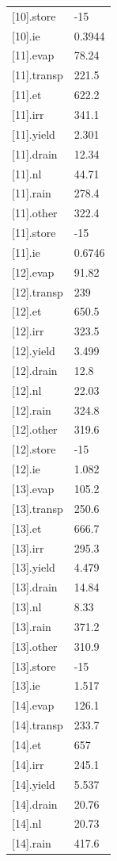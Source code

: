 {\begin{longtable}{p{}p{}}
{}[10].store & -15\\
{}[10].ie & 0.3944\\
{}[11].evap & 78.24\\
{}[11].transp & 221.5\\
{}[11].et & 622.2\\
{}[11].irr & 341.1\\
{}[11].yield & 2.301\\
{}[11].drain & 12.34\\
{}[11].nl & 44.71\\
{}[11].rain & 278.4\\
{}[11].other & 322.4\\
{}[11].store & -15\\
{}[11].ie & 0.6746\\
{}[12].evap & 91.82\\
{}[12].transp & 239\\
{}[12].et & 650.5\\
{}[12].irr & 323.5\\
{}[12].yield & 3.499\\
{}[12].drain & 12.8\\
{}[12].nl & 22.03\\
{}[12].rain & 324.8\\
{}[12].other & 319.6\\
{}[12].store & -15\\
{}[12].ie & 1.082\\
{}[13].evap & 105.2\\
{}[13].transp & 250.6\\
{}[13].et & 666.7\\
{}[13].irr & 295.3\\
{}[13].yield & 4.479\\
{}[13].drain & 14.84\\
{}[13].nl & 8.33\\
{}[13].rain & 371.2\\
{}[13].other & 310.9\\
{}[13].store & -15\\
{}[13].ie & 1.517\\
{}[14].evap & 126.1\\
{}[14].transp & 233.7\\
{}[14].et & 657\\
{}[14].irr & 245.1\\
{}[14].yield & 5.537\\
{}[14].drain & 20.76\\
{}[14].nl & 20.73\\
{}[14].rain & 417.6\\

\end{longtable}}
